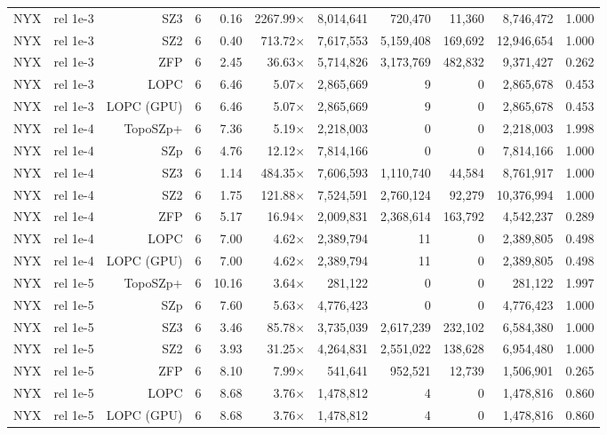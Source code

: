 \begin{tabular}{lrrrrrrrrrr}
NYX & rel 1e-3 & SZ3 & 6 & 0.16 & 2267.99$\times$ & 8,014,641 & 720,470 & 11,360 & 8,746,472 & 1.000 \\
NYX & rel 1e-3 & SZ2 & 6 & 0.40 & 713.72$\times$ & 7,617,553 & 5,159,408 & 169,692 & 12,946,654 & 1.000 \\
NYX & rel 1e-3 & ZFP & 6 & 2.45 & 36.63$\times$ & 5,714,826 & 3,173,769 & 482,832 & 9,371,427 & 0.262 \\
NYX & rel 1e-3 & LOPC & 6 & 6.46 & 5.07$\times$ & 2,865,669 & 9 & 0 & 2,865,678 & 0.453 \\
NYX & rel 1e-3 & LOPC (GPU) & 6 & 6.46 & 5.07$\times$ & 2,865,669 & 9 & 0 & 2,865,678 & 0.453 \\
NYX & rel 1e-4 & TopoSZp+ & 6 & 7.36 & 5.19$\times$ & 2,218,003 & 0 & 0 & 2,218,003 & 1.998 \\
NYX & rel 1e-4 & SZp & 6 & 4.76 & 12.12$\times$ & 7,814,166 & 0 & 0 & 7,814,166 & 1.000 \\
NYX & rel 1e-4 & SZ3 & 6 & 1.14 & 484.35$\times$ & 7,606,593 & 1,110,740 & 44,584 & 8,761,917 & 1.000 \\
NYX & rel 1e-4 & SZ2 & 6 & 1.75 & 121.88$\times$ & 7,524,591 & 2,760,124 & 92,279 & 10,376,994 & 1.000 \\
NYX & rel 1e-4 & ZFP & 6 & 5.17 & 16.94$\times$ & 2,009,831 & 2,368,614 & 163,792 & 4,542,237 & 0.289 \\
NYX & rel 1e-4 & LOPC & 6 & 7.00 & 4.62$\times$ & 2,389,794 & 11 & 0 & 2,389,805 & 0.498 \\
NYX & rel 1e-4 & LOPC (GPU) & 6 & 7.00 & 4.62$\times$ & 2,389,794 & 11 & 0 & 2,389,805 & 0.498 \\
NYX & rel 1e-5 & TopoSZp+ & 6 & 10.16 & 3.64$\times$ & 281,122 & 0 & 0 & 281,122 & 1.997 \\
NYX & rel 1e-5 & SZp & 6 & 7.60 & 5.63$\times$ & 4,776,423 & 0 & 0 & 4,776,423 & 1.000 \\
NYX & rel 1e-5 & SZ3 & 6 & 3.46 & 85.78$\times$ & 3,735,039 & 2,617,239 & 232,102 & 6,584,380 & 1.000 \\
NYX & rel 1e-5 & SZ2 & 6 & 3.93 & 31.25$\times$ & 4,264,831 & 2,551,022 & 138,628 & 6,954,480 & 1.000 \\
NYX & rel 1e-5 & ZFP & 6 & 8.10 & 7.99$\times$ & 541,641 & 952,521 & 12,739 & 1,506,901 & 0.265 \\
NYX & rel 1e-5 & LOPC & 6 & 8.68 & 3.76$\times$ & 1,478,812 & 4 & 0 & 1,478,816 & 0.860 \\
NYX & rel 1e-5 & LOPC (GPU) & 6 & 8.68 & 3.76$\times$ & 1,478,812 & 4 & 0 & 1,478,816 & 0.860 \\

\end{tabular}
